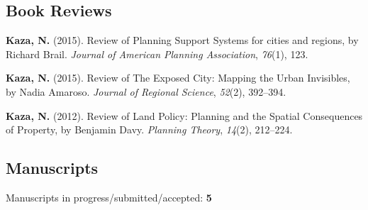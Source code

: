 \documentclass[11pt,a4paper,]{awesome-cv}
\newlength{\cslhangindent}
\newenvironment{CSLReferences}[2] %
 {\begin{list}{}{%
  \setlength{\itemindent}{0pt}
  \setlength{\leftmargin}{0pt}
  \setlength{\parsep}{0pt}
  \ifodd #1
   \setlength{\leftmargin}{\cslhangindent}
   \setlength{\itemindent}{-1\cslhangindent}
  \fi
  \setlength{\itemsep}{#2\baselineskip}}}
 {\end{list}}
\begin{document}
\subsection{Book Reviews}\label{book-reviews}

\label{refs-9d813b9b50b9a7c1479407785f88ee9c}
\begin{CSLReferences}{1}{0}
\textbf{Kaza, N.} (2015). Review of Planning Support Systems for cities
and regions, by Richard Brail. \emph{Journal of American Planning
Association}, \emph{76}(1), 123.

\textbf{Kaza, N.} (2015). Review of The Exposed City: Mapping the Urban
Invisibles, by Nadia Amaroso. \emph{Journal of Regional Science},
\emph{52}(2), 392--394.

\textbf{Kaza, N.} (2012). Review of Land Policy: Planning and the
Spatial Consequences of Property, by Benjamin Davy. \emph{Planning
Theory}, \emph{14}(2), 212--224.

\end{CSLReferences}

\subsection{Manuscripts}\label{manuscripts}

Manuscripts in progress/submitted/accepted: \textbf{5}
\end{document}
